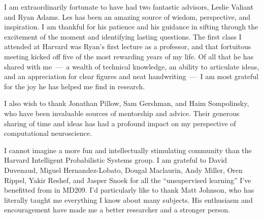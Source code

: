 
\vspace{-1em}
I am extraordinarily fortunate to have had two fantastic advisors, Leslie Valiant and Ryan Adams.
Les has been an amazing source of
wisdom, perspective, and inspiration. I am thankful for
his patience and his guidance in sifting through
the excitement of the moment and identifying lasting
questions. 
The first class I attended at Harvard was Ryan's first lecture as a professor,
and that fortuitous meeting kicked off five of the most
rewarding years of my life.
Of all that he has shared with me~---~a wealth of technical knowledge,
an ability to articulate ideas, and an appreciation for
clear figures and neat handwriting~---~I am most grateful for the joy he has helped me find in research.

I also wish to thank Jonathan Pillow, Sam Gershman, and Haim
Sompolinsky, who have been invaluable sources of mentorship and
advice.  Their generous sharing of time and ideas has had a profound
impact on my perspective of computational neuroscience.



I cannot imagine a more fun and intellectually stimulating community
than the Harvard Intelligent Probabilistic Systems group.  I am
grateful to David Duvenaud, Miguel Hernandez-Lobato, Dougal Maclaurin,
Andy Miller, Oren Rippel, Yakir Reshef, and Jasper Snoek for all the
``unsupervised learning'' I've benefitted from in MD209.
I'd particularly like to thank Matt Johnson, who has literally taught
me everything I know about many subjects.  His enthusiasm and
encouragement have made me a better researcher and a stronger person.


